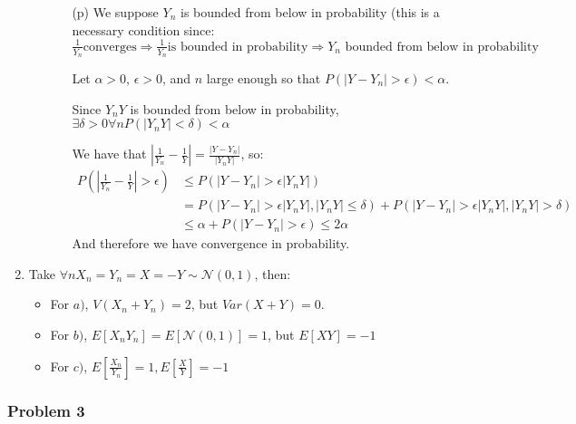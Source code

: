 \documentclass[12pt]{article}
\newcommand{\Q}[1]{\subsubsection*{Problem #1}}
\begin{document}
\begin{enumerate}
\begin{itemize}
\begin{itemize}
\item[(p)]
  We suppose $Y_n$ is bounded from below in probability (this is a necessary condition since: $\frac1 {Y_n} \text{converges} \Rightarrow \frac 1 {Y_n} \text{is bounded in probability} \Rightarrow Y_n \text{ bounded from below in probability}$

  Let $\alpha > 0$, $\epsilon > 0$, and $n$ large enough so that $ P(|Y - Y_n| > \epsilon) < \alpha$.

  Since $Y_nY$ is bounded from below in probability, $\exists \delta > 0 \forall n P(|Y_nY| < \delta) < \alpha $

  We have that $|\frac1 {Y_n} - \frac1 {Y}| = \frac{|Y - Y_n|}{|Y_nY|}$, so:
  \begin{align*}
    P(|\frac1 {Y_n} - \frac1 {Y}| > \epsilon)
    &\le P(|Y - Y_n| > \epsilon |Y_nY|)
    \\&= P(|Y - Y_n| > \epsilon |Y_nY|, |Y_nY| \le \delta)  + P(|Y - Y_n| > \epsilon |Y_nY|, |Y_nY| > \delta)
    \\&\le \alpha + P(|Y - Y_n| > \epsilon)
        \le 2\alpha
  \end{align*}
  And therefore we have convergence in probability.
\end{itemize}
\end{itemize}
\item Take $\forall n X_n = Y_n = X = -Y \sim \mathcal N(0,1)$, then:
  \begin{itemize}
  \item For $a)$, $V(X_n+Y_n) = 2$, but $Var(X+Y) = 0$.
  \item For $b)$, $E[X_nY_n] = E[\mathcal N(0, 1)] = 1$, but
    $E[XY] = -1$
  \item For $c)$, $E[\frac{X_n}{Y_n}] = 1, E[\frac{X}{Y}] = -1$
  \end{itemize}

\end{enumerate}
\Q{3}
\end{document}
